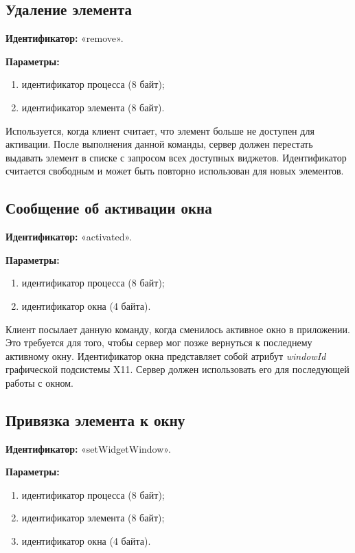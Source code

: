 \subsection{Удаление элемента}

\textbf{Идентификатор:} «remove».

\textbf{Параметры:}
\begin{enumerate}
\item идентификатор процесса (8 байт);
\item идентификатор элемента (8 байт).
\end{enumerate}

Используется, когда клиент считает, что элемент больше не доступен для
активации. После выполнения данной команды, сервер должен перестать выдавать
элемент в списке с запросом всех доступных виджетов. Идентификатор считается
свободным и может быть повторно использован для новых элементов.

\subsection{Сообщение об активации окна}

\textbf{Идентификатор:} «activated».

\textbf{Параметры:}
\begin{enumerate}
\item идентификатор процесса (8 байт);
\item идентификатор окна (4 байта).
\end{enumerate}

Клиент посылает данную команду, когда сменилось активное окно в приложении. Это
требуется для того, чтобы сервер мог позже вернуться к последнему активному
окну. Идентификатор окна представляет собой атрибут \textit{windowId}
графической подсистемы X11. Сервер должен использовать его для последующей
работы с окном.

\subsection{Привязка элемента к окну}

\textbf{Идентификатор:} «setWidgetWindow».

\textbf{Параметры:}
\begin{enumerate}
\item идентификатор процесса (8 байт);
\item идентификатор элемента (8 байт);
\item идентификатор окна (4 байта).
\end{enumerate}

